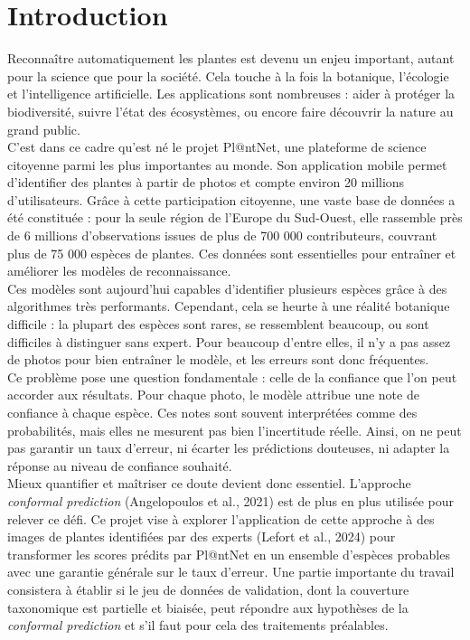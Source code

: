 \documentclass[12pt,a4paper]{article}
\begin{document}
\section{Introduction}
Reconnaître automatiquement les plantes est devenu un enjeu important, autant pour la science que pour la société. Cela touche à la fois la botanique, l'écologie et l'intelligence artificielle. Les applications sont nombreuses : aider à protéger la biodiversité, suivre l'état des écosystèmes, ou encore faire découvrir la nature au grand public.\\

C'est dans ce cadre qu'est né le projet Pl@ntNet, une plateforme de science citoyenne parmi les plus importantes au monde. Son application mobile permet d'identifier des plantes à partir de photos et compte environ 20 millions d'utilisateurs. Grâce à cette participation citoyenne, une vaste base de données a été constituée : pour la seule région de l'Europe du Sud-Ouest, elle rassemble près de 6 millions d'observations issues de plus de 700 000 contributeurs, couvrant plus de 75 000 espèces de plantes. Ces données sont essentielles pour entraîner et améliorer les modèles de reconnaissance.\\

Ces modèles sont aujourd'hui capables d'identifier plusieurs espèces grâce à des algorithmes très performants. Cependant, cela se heurte à une réalité botanique difficile : la plupart des espèces sont rares, se ressemblent beaucoup, ou sont difficiles à distinguer sans expert. Pour beaucoup d'entre elles, il n'y a pas assez de photos pour bien entraîner le modèle, et les erreurs sont donc fréquentes.\\

Ce problème pose une question fondamentale : celle de la confiance que l'on peut accorder aux résultats. Pour chaque photo, le modèle attribue une note de confiance à chaque espèce. Ces notes sont souvent interprétées comme des probabilités, mais elles ne mesurent pas bien l'incertitude réelle. Ainsi, on ne peut pas garantir un taux d'erreur, ni écarter les prédictions douteuses, ni adapter la réponse au niveau de confiance souhaité.\\

Mieux quantifier et maîtriser ce doute devient donc essentiel. L’approche \textit{conformal prediction} (Angelopoulos et al., 2021) est de plus en plus utilisée pour relever ce défi. Ce projet vise à explorer l’application de cette approche à des images de plantes identifiées par des experts (Lefort et al., 2024) pour transformer les scores prédits par Pl@ntNet en un ensemble d’espèces probables avec une garantie générale sur le taux d’erreur. Une partie importante du travail consistera à établir si le jeu de données de validation, dont la couverture taxonomique est partielle et biaisée, peut répondre aux hypothèses de la \textit{conformal prediction} et s’il faut pour cela des traitements préalables.\\
\end{document}
